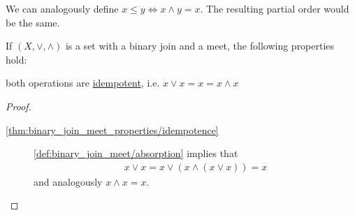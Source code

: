 \begin{note}\label{note:binary_join_meet_order}
  We can analogously define $x \leq y \iff x \land y = x$. The resulting partial order would be the same.
\end{note}

\begin{proposition}\label{thm:binary_join_meet_properties}
  If $(X, \lor, \land)$ is a set with a binary join and a meet, the following properties hold:
  \begin{defenum}
    \item\label{thm:binary_join_meet_properties/idempotence} both operations are \uline{idempotent}, i.e. $x \lor x = x = x \land x$
  \end{defenum}
\end{proposition}
\begin{proof}
  \begin{description}
    \item[\ref{thm:binary_join_meet_properties/idempotence}] \ref{def:binary_join_meet/absorption} implies that
    \begin{align*}
      x \lor x = x \lor (x \land (x \lor x)) = x
    \end{align*}
    and analogously $x \land x = x$.
  \end{description}
\end{proof}

